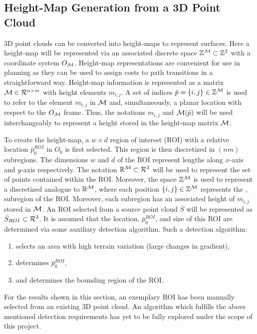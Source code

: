 		\subsection{Height-Map Generation from a 3D Point Cloud}
			
			3D point clouds can be converted into height-maps to represent surfaces. Here a height-map will be represented via an associated discrete space ${\Bbb Z}^{{\cal M}}\subset{\Bbb Z}^{2}$ with a coordinate system $O_{{\cal M}}$. Height-map representations are convenient for use in planning as they can be used to assign costs to path transitions in a straightforward way. Height-map information is represented as a matrix ${\cal M}\in {\cal R}^{n\times m}$ with height elements $m_{i,j}$. A set of indices $\bar{p} = \{i,j\}\in{\Bbb Z}^{{\cal M}}$ is used to refer to the element $m_{i,j}$ in ${\cal M}$ and, simultaneously, a planar location with respect to the $O_{{\cal M}}$ frame. Thus, the notations $m_{i,j}$ and ${\cal M}(\bar{p})$ will be used interchangeably to represent a height stored in the height-map matrix ${\cal M}$.

			To create the height-map, a $w\times d$ region of interest (ROI) with a relative location $\bar{p}_{0}^{ROI}$ in $O_{0}$ is first selected. This region is then discretized in $(nm)$ subregions. The dimensions $w$ and $d$ of the ROI represent lengths along $x$-axis and $y$-axis respectively. The notation ${\Bbb R}^{{\cal M}}\subset {\cal R}^{3}$ will be used to represent the set of points contained within the ROI.  Moreover, the space ${\Bbb Z}^{{\cal M}}$ is used to represent a discretized analogue to ${\Bbb R}^{{\cal M}}$, where each position $\{i,j\}\in{\Bbb Z}^{{\cal M}}$ represents the \Ith, \Jth subregion of the ROI. Moreover, each subregion has an associated height of $m_{i,j}$ stored in ${\cal M}$. An ROI selected from a source point cloud $\bar{S}$ will be represented as $\bar{S}_{ROI}\subset{\cal R}^{3}$. It is assumed that the location, $\bar{p}_{0}^{ROI}$, and size of this ROI are determined via some auxiliary detection algorithm. Such a detection algorithm: 
			\begin{enumerate}
				\item selects an area with high terrain variation (large changes in gradient),
				\item determines $\bar{p}_{0}^{ROI}$,
				\item and determines the bounding region of the ROI.
			\end{enumerate}%
			For the results shown in this section, an exemplary ROI has been manually selected from an existing 3D point cloud. An algorithm which fulfills the above mentioned detection requirements has yet to be fully explored under the scope of this project. %

